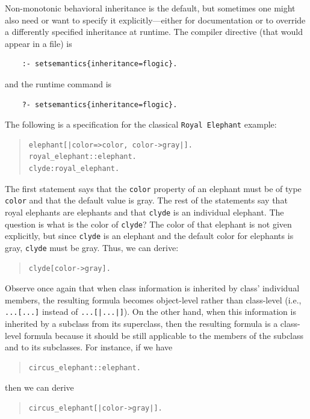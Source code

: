 \documentclass[11pt]{article}
\newcommand{\ERGO}{\mbox{\smaller{\ensuremath{\cal{E}}\smaller{{\sc{RGO}}}}}\xspace}
\newcommand{\FLSYSTEM}{\ERGO}
\begin{document}
Non-monotonic behavioral inheritance is the default, but sometimes one
might also need or want
to specify it explicitly---either for documentation or to override
a differently specified inheritance at runtime. The compiler directive
(that would appear in a file) is
\begin{verbatim}
    :- setsemantics{inheritance=flogic}.
\end{verbatim}
and the runtime command is
\begin{verbatim}
    ?- setsemantics{inheritance=flogic}.
\end{verbatim}
The following is a \FLSYSTEM specification
for the classical {\tt Royal Elephant} example:
\begin{quote}
\begin{verbatim}
elephant[|color=>color, color->gray|].
royal_elephant::elephant.
clyde:royal_elephant.
\end{verbatim}
\end{quote}
The first statement says that the \texttt{color} property of an elephant
must be of type \texttt{color} and that the default value is gray.  
The rest of the statements say that royal elephants are elephants and that
\texttt{clyde} is an individual elephant. 
The question is what is the color of {\tt clyde}? The color of that
elephant is not given explicitly, but since
{\tt clyde} is an elephant and the default color for elephants is gray,
{\tt clyde}
must be gray. Thus, we can derive:
\begin{quote}
\begin{verbatim}
clyde[color->gray].  
\end{verbatim}
\end{quote}
Observe once again that when class information is inherited by class'
individual members, the resulting formula becomes object-level rather than 
class-level (i.e., \texttt{...[...]} instead of \texttt{...[|...|]}).  
On the other
hand, when this information is inherited by a subclass from its superclass,
then the resulting formula is a class-level formula because it should be
still applicable to the members of the subclass and to its subclasses.
For instance, if we have
\begin{quote}
\begin{verbatim}
circus_elephant::elephant.
\end{verbatim}
\end{quote}
then we can derive 
\begin{quote}
\begin{verbatim}
circus_elephant[|color->gray|].  
\end{verbatim}
\end{quote}
\end{document}
